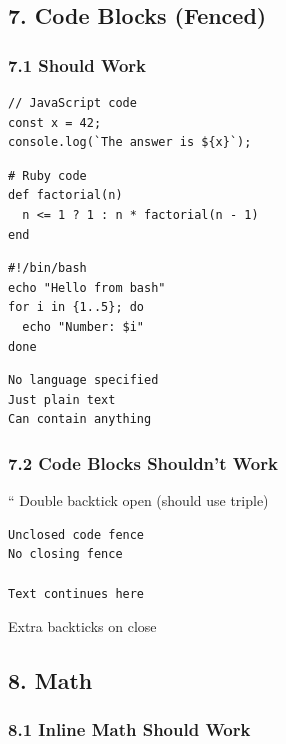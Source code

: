 \documentclass{article}
\begin{document}
\noindent\hrulefill

\subsection{ 7. Code Blocks (Fenced)}

\subsubsection{ 7.1 Should Work}

\begin{verbatim}
// JavaScript code
const x = 42;
console.log(`The answer is ${x}`);
\end{verbatim}

\begin{verbatim}
# Ruby code
def factorial(n)
  n <= 1 ? 1 : n * factorial(n - 1)
end
\end{verbatim}

\begin{verbatim}
#!/bin/bash
echo "Hello from bash"
for i in {1..5}; do
  echo "Number: $i"
done
\end{verbatim}

\begin{verbatim}
No language specified
Just plain text
Can contain anything
\end{verbatim}

\subsubsection{ 7.2 Code Blocks Shouldn't Work}

`` Double backtick open (should use triple)

\begin{verbatim}
Unclosed code fence
No closing fence

Text continues here

\end{verbatim}

Extra backticks on close

\noindent\hrulefill

\subsection{ 8. Math}

\subsubsection{ 8.1 Inline Math Should Work}
\end{document}
